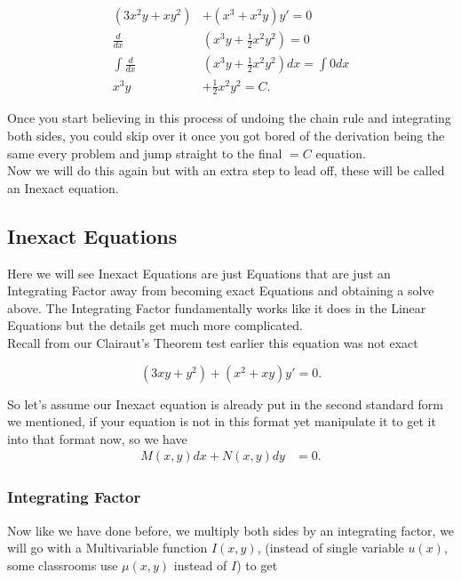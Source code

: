 \documentclass[12pt]{article}
\begin{document}
\begin{align*}
    (3x^2y+xy^2)& + (x^3+x^2y)y'=0 \\
    \frac{d}{dx}&(x^3y+\frac{1}{2}x^2y^2)=0 \\
    \int \frac{d}{dx}&(x^3y+\frac{1}{2}x^2y^2) dx =\int 0 dx \\
    x^3y&+\frac{1}{2}x^2y^2 = C. 
\end{align*}

Once you start believing in this process of undoing the chain rule and integrating both sides, you could skip over it once you got bored of the derivation being the same every problem and jump straight to the final $=C$ equation. \\

Now we will do this again but with an extra step to lead off, these will be called an Inexact equation.

\subsection{Inexact Equations}

Here we will see Inexact Equations are just Equations that are just an Integrating Factor away from becoming exact Equations and obtaining a solve above. The Integrating Factor fundamentally works like it does in the Linear Equations but the details get much more complicated. \\

Recall from our Clairaut's Theorem test earlier this equation was not exact

\begin{equation*}
    (3xy+y^2) + (x^2+xy)y'=0.
\end{equation*}

So let's assume our Inexact equation is already put in the second standard form we mentioned, if your equation is not in this format yet manipulate it to get it into that format now, so we have
\begin{align*}
    M(x,y)dx+N(x,y)dy &= 0.
\end{align*}

\subsubsection{Integrating Factor}

Now like we have done before, we multiply both sides by an integrating factor, we will go with a Multivariable function $I(x,y)$, (instead of single variable $u(x)$, some classrooms use $\mu(x,y)$ instead of $I$) to get
\end{document}
